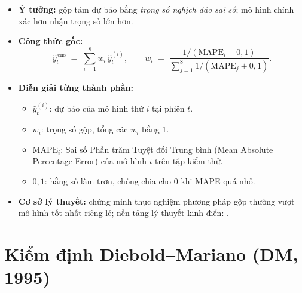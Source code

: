 \documentclass[12pt,a4paper,openany,oneside]{report}
\numberwithin{equation}{chapter}
\begin{document}
\begin{itemize}[leftmargin=18pt,topsep=2pt,itemsep=4pt]
  \item \textbf{Ý tưởng:} gộp tám dự báo bằng \emph{trọng số nghịch đảo
        sai số}; mô hình chính xác hơn nhận trọng số lớn hơn.
  \item \textbf{Công thức gốc:}
        \begin{equation}
          \hat{y}_t^{\,\text{ens}} \;=\; \sum_{i=1}^{8} w_i\,\hat{y}_t^{(i)},
          \qquad
          w_i \;=\; \dfrac{1/(\text{MAPE}_i + 0{,}1)}
                          {\sum_{j=1}^{8} 1/(\text{MAPE}_j + 0{,}1)}.
          \label{eq:ensemble}
        \end{equation}
  \item \textbf{Diễn giải từng thành phần:}
        \begin{itemize}[leftmargin=14pt,topsep=2pt,itemsep=1pt]
          \item $\hat{y}_t^{(i)}$: dự báo của mô hình thứ $i$ tại phiên $t$.
          \item $w_i$: trọng số gộp, tổng các $w_i$ bằng 1.
          \item $\text{MAPE}_i$: Sai số Phần trăm Tuyệt đối Trung bình
                (Mean Absolute Percentage Error) của mô hình $i$ trên
                tập kiểm thử.
          \item $0{,}1$: hằng số làm trơn, chống chia cho 0 khi MAPE quá nhỏ.
        \end{itemize}
  \item \textbf{Cơ sở lý thuyết:} \citet{StockWatson2004} chứng minh
        thực nghiệm phương pháp gộp thường vượt mô hình tốt nhất riêng
        lẻ; nền tảng lý thuyết kinh điển: \citet{BatesGranger1969}.
\end{itemize}

\section{Kiểm định Diebold--Mariano (DM, 1995)}
\end{document}
